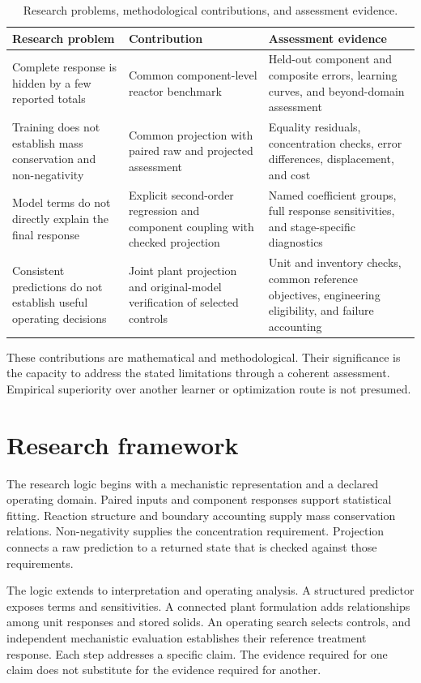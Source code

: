 \begin{table}[htbp]
\centering\small
\caption{Research problems, methodological contributions, and assessment evidence.}
\label{tab:introduction_contributions}
\begin{tabular}{p{}p{}p{}}
\toprule
Research problem & Contribution & Assessment evidence\\
\midrule
Complete response is hidden by a few reported totals & Common component-level reactor benchmark & Held-out component and composite errors, learning curves, and beyond-domain assessment\\
Training does not establish mass conservation and non-negativity & Common projection with paired raw and projected assessment & Equality residuals, concentration checks, error differences, displacement, and cost\\
Model terms do not directly explain the final response & Explicit second-order regression and component coupling with checked projection & Named coefficient groups, full response sensitivities, and stage-specific diagnostics\\
Consistent predictions do not establish useful operating decisions & Joint plant projection and original-model verification of selected controls & Unit and inventory checks, common reference objectives, engineering eligibility, and failure accounting\\
\bottomrule
\end{tabular}
\end{table}

These contributions are mathematical and methodological. Their significance is the capacity to address the stated limitations through a coherent assessment. Empirical superiority over another learner or optimization route is not presumed.

\section{Research framework}

The research logic begins with a mechanistic representation and a declared operating domain. Paired inputs and component responses support statistical fitting. Reaction structure and boundary accounting supply mass conservation relations. Non-negativity supplies the concentration requirement. Projection connects a raw prediction to a returned state that is checked against those requirements.

The logic extends to interpretation and operating analysis. A structured predictor exposes terms and sensitivities. A connected plant formulation adds relationships among unit responses and stored solids. An operating search selects controls, and independent mechanistic evaluation establishes their reference treatment response. Each step addresses a specific claim. The evidence required for one claim does not substitute for the evidence required for another.

